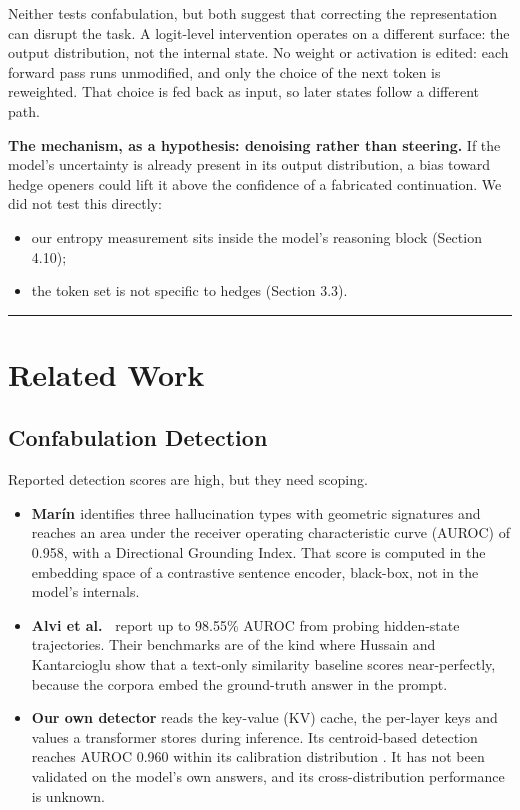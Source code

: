 \documentclass[11pt,letterpaper]{article}
\providecommand{\tightlist}{\setlength{\itemsep}{0pt}\setlength{\parskip}{0pt}}
\DeclareRobustCommand{\_}{\textunderscore\allowbreak}
\begin{document}
Neither tests confabulation, but both suggest that correcting the representation can disrupt the task. A logit-level intervention operates on a different surface: the output distribution, not the internal state. No weight or activation is edited: each forward pass runs unmodified, and only the choice of the next token is reweighted. That choice is fed back as input, so later states follow a different path.

\textbf{The mechanism, as a hypothesis: denoising rather than steering.} If the model's uncertainty is already present in its output distribution, a bias toward hedge openers could lift it above the confidence of a fabricated continuation. We did not test this directly:

\begin{itemize}
\tightlist
\item
  our entropy measurement sits inside the model's reasoning block (Section 4.10);
\item
  the token set is not specific to hedges (Section 3.3).
\end{itemize}

\begin{center}\rule{0.5\linewidth}{0.5pt}\end{center}

\hypertarget{related-work}{%
\section{Related Work}\label{related-work}}

\hypertarget{confabulation-detection}{%
\subsection{Confabulation Detection}\label{confabulation-detection}}

Reported detection scores are high, but they need scoping.

\begin{itemize}
\tightlist
\item
  \textbf{Marín \cite{marin2026geometric}} identifies three hallucination types with geometric signatures and reaches an area under the receiver operating characteristic curve (AUROC) of 0.958, with a Directional Grounding Index. That score is computed in the embedding space of a contrastive sentence encoder, black-box, not in the model's internals.
\item
  \textbf{Alvi et al.~\cite{alvi2026multihaldet}} report up to 98.55\% AUROC from probing hidden-state trajectories. Their benchmarks are of the kind where Hussain and Kantarcioglu \cite{hussain2026parallax} show that a text-only similarity baseline scores near-perfectly, because the corpora embed the ground-truth answer in the prompt.
\item
  \textbf{Our own detector} reads the key-value (KV) cache, the per-layer keys and values a transformer stores during inference. Its centroid-based detection reaches AUROC 0.960 within its calibration distribution \cite{edrington2026oracle}. It has not been validated on the model's own answers, and its cross-distribution performance is unknown.
\end{itemize}
\end{document}
